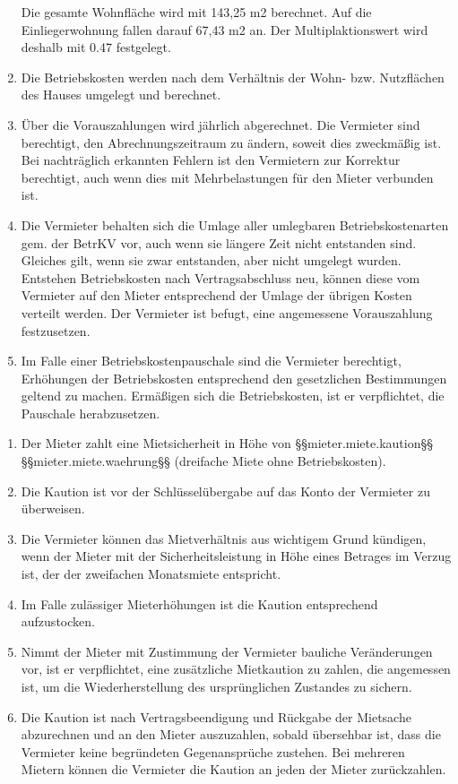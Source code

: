 \documentclass{scrreprt}[12pt,a4paper,twoside,duplex]
\begin{document}
\begin{contract}
\begin{enumerate}
  Die gesamte Wohnfläche wird mit 143,25 m2 berechnet. Auf die Einliegerwohnung fallen darauf 67,43 m2 an. Der Multiplaktionswert wird deshalb mit 0.47 festgelegt.
  \item Die Betriebskosten werden nach dem Verhältnis der Wohn- bzw. Nutzflächen des Hauses umgelegt und berechnet.
  \item Über die Vorauszahlungen wird jährlich abgerechnet. Die Vermieter sind berechtigt, den Abrechnungszeitraum zu ändern, soweit dies zweckmäßig ist. Bei nachträglich erkannten Fehlern ist den Vermietern zur Korrektur berechtigt, auch wenn dies mit Mehrbelastungen für den Mieter verbunden ist.
  \item Die Vermieter behalten sich die Umlage aller umlegbaren Betriebskostenarten gem. der BetrKV vor, auch wenn sie längere Zeit nicht entstanden sind. Gleiches gilt, wenn sie zwar entstanden, aber nicht umgelegt wurden. Entstehen Betriebskosten nach Vertragsabschluss neu, können diese vom Vermieter auf den Mieter entsprechend der Umlage der übrigen Kosten verteilt werden. Der Vermieter ist befugt, eine angemessene Vorauszahlung festzusetzen.
  \item Im Falle einer Betriebskostenpauschale sind die Vermieter berechtigt, Erhöhungen der Betriebskosten entsprechend den gesetzlichen Bestimmungen geltend zu machen. Ermäßigen sich die Betriebskosten, ist er verpflichtet, die Pauschale herabzusetzen.
\end{enumerate}
\end{contract}

\begin{contract}

	\begin{enumerate}
		\item Der Mieter zahlt eine Mietsicherheit in Höhe von §§mieter.miete.kaution§§ §§mieter.miete.waehrung§§ (dreifache Miete ohne Betriebskosten).
		\item Die Kaution ist vor der Schlüsselübergabe auf das Konto der Vermieter zu überweisen.
		\item Die Vermieter können das Mietverhältnis aus wichtigem Grund kündigen, wenn der Mieter mit der Sicherheitsleistung in Höhe eines Betrages im Verzug ist, der der zweifachen Monatsmiete entspricht.
		\item Im Falle zulässiger Mieterhöhungen ist die Kaution entsprechend aufzustocken.
		\item Nimmt der Mieter mit Zustimmung der Vermieter bauliche Veränderungen vor,  ist er verpflichtet, eine zusätzliche Mietkaution zu zahlen, die angemessen ist, um die Wiederherstellung des ursprünglichen Zustandes zu sichern.
		\item Die Kaution ist nach Vertragsbeendigung und Rückgabe der Mietsache abzurechnen und an den Mieter auszuzahlen, sobald übersehbar ist, dass die Vermieter keine begründeten Gegenansprüche zustehen. Bei mehreren Mietern können die Vermieter die Kaution an jeden der Mieter zurückzahlen.
	\end{enumerate}
\end{contract}
\end{document}
